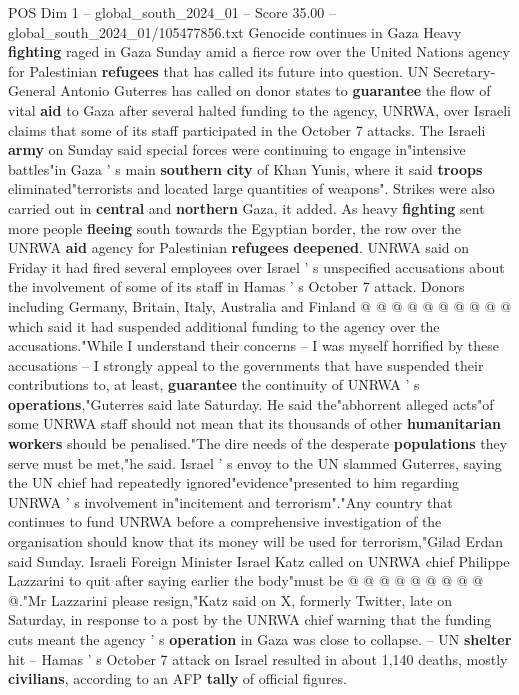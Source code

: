 \begin{textsample}{POS Dim 1 – global\_south\_2024\_01 – Score 35.00 – global\_south\_2024\_01/105477856.txt}  \label{ex:f1_pos_114}
Genocide continues in Gaza Heavy \textbf{fighting} raged in Gaza Sunday amid a fierce row over the United Nations agency for Palestinian \textbf{refugees} that has called its future into question.
UN Secretary-General Antonio Guterres has called on donor states to \textbf{guarantee} the flow of vital \textbf{aid} to Gaza after several halted funding to the agency, UNRWA, over Israeli claims that some of its staff participated in the October 7 attacks.
The Israeli \textbf{army} on Sunday said special forces were continuing to engage in"intensive battles"in Gaza ' s main \textbf{southern} \textbf{city} of Khan Yunis, where it said \textbf{troops} eliminated"terrorists and located large quantities of weapons".
Strikes were also carried out in \textbf{central} and \textbf{northern} Gaza, it added.
As heavy \textbf{fighting} sent more people \textbf{fleeing} south towards the Egyptian border, the row over the UNRWA \textbf{aid} agency for Palestinian \textbf{refugees} \textbf{deepened}.
UNRWA said on Friday it had fired several employees over Israel ' s unspecified accusations about the involvement of some of its staff in Hamas ' s October 7 attack.
Donors including Germany, Britain, Italy, Australia and Finland @ @ @ @ @ @ @ @ @ @ which said it had suspended additional funding to the agency over the accusations."While I understand their concerns -- I was myself horrified by these accusations -- I strongly appeal to the governments that have suspended their contributions to, at least, \textbf{guarantee} the continuity of UNRWA ' s \textbf{operations},"Guterres said late Saturday.
He said the"abhorrent alleged acts"of some UNRWA staff should not mean that its thousands of other \textbf{humanitarian} \textbf{workers} should be penalised."The dire needs of the desperate \textbf{populations} they serve must be met,"he said.
Israel ' s envoy to the UN slammed Guterres, saying the UN chief had repeatedly ignored"evidence"presented to him regarding UNRWA ' s involvement in"incitement and terrorism"."Any country that continues to fund UNRWA before a comprehensive investigation of the organisation should know that its money will be used for terrorism,"Gilad Erdan said Sunday.
Israeli Foreign Minister Israel Katz called on UNRWA chief Philippe Lazzarini to quit after saying earlier the body"must be @ @ @ @ @ @ @ @ @ @."Mr Lazzarini please resign,"Katz said on X, formerly Twitter, late on Saturday, in response to a post by the UNRWA chief warning that the funding cuts meant the agency ' s \textbf{operation} in Gaza was close to collapse. -- UN \textbf{shelter} hit -- Hamas ' s October 7 attack on Israel resulted in about 1,140 deaths, mostly \textbf{civilians}, according to an AFP \textbf{tally} of official figures.

\end{textsample}
